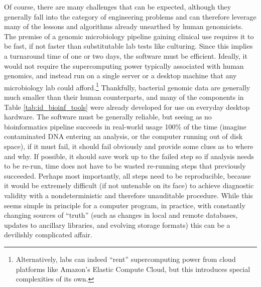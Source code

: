 Of course, there are many challenges that can be expected, although they generally fall into the category of engineering problems and can therefore leverage many of the lessons and algorithms already unearthed by human genomicists. The premise of a genomic microbiology pipeline gaining clinical use requires it to be fast, if not faster than substitutable lab tests like culturing.\autocite{Koser2012} Since this implies a turnaround time of one or two days, the software must be efficient. Ideally, it would not require the supercomputing power typically associated with human genomics, and instead run on a single server or a desktop machine that any microbiology lab could afford.\footnote{Alternatively, labs can indeed ``rent'' supercomputing power from cloud platforms like Amazon's Elastic Compute Cloud, but this introduces special complexities of its own.} Thankfully, bacterial genomic data are generally much smaller than their human counterparts, and many of the components in Table \ref{tab:id_bioinf_tools} were already developed for use on everyday desktop hardware. The software must be generally reliable, but seeing as no bioinformatics pipeline succeeds in real-world usage 100\% of the time (imagine contaminated DNA entering an analysis, or the computer running out of disk space), if it must fail, it should fail obviously and provide some clues as to where and why. If possible, it should save work up to the failed step so if analysis needs to be re-run, time does not have to be wasted re-running steps that previously succeeded. Perhaps most importantly, all steps need to be reproducible, because it would be extremely difficult (if not untenable on its face) to achieve diagnostic validity with a nondeterministic and therefore unauditable procedure. While this seems simple in principle for a computer program, in practice, with constantly changing sources of ``truth'' (such as changes in local and remote databases, updates to ancillary libraries, and evolving storage formats) this can be a devilishly complicated affair.

